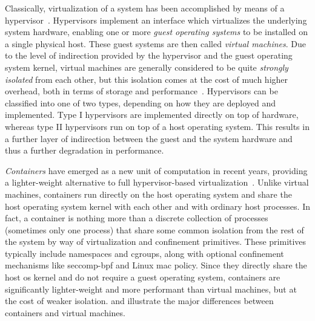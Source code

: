Classically, virtualization of a system has been accomplished by means of
a hypervisor~\cite{eder2016_hypervisor_container, sultan2019_container_security}.
Hypervisors implement an interface which virtualizes the underlying system hardware,
enabling one or more \textit{guest operating systems} to be installed on a single physical
host. These guest systems are then called \textit{virtual machines}. Due to the level of
indirection provided by the hypervisor and the guest operating system kernel, virtual
machines are generally considered to be quite \textit{strongly isolated} from each other,
but this isolation comes at the cost of much higher overhead, both in terms of storage and
performance~\cite{eder2016_hypervisor_container, sultan2019_container_security}.
Hypervisors can be classified into one of two types, depending on how they are deployed
and implemented.  Type I hypervisors are implemented directly on top of hardware, whereas
type II hypervisors run on top of a host operating system. This results in a further layer
of indirection between the guest and the system hardware and thus a further degradation in
performance.

\textit{Containers} have emerged as a new unit of computation in recent years, providing
a lighter-weight alternative to full hypervisor-based
virtualization~\cite{sultan2019_container_security, eder2016_hypervisor_container}.
Unlike virtual machines, containers run directly on the host operating system and share
the host operating system kernel with each other and with ordinary host processes. In
fact, a container is nothing more than a discrete collection of processes (sometimes only
one process) that share some common isolation from the rest of the system by way of
virtualization and confinement primitives. These primitives typically include namespaces
and cgroups, along with optional confinement mechanisms like seccomp-\gls{bpf} and Linux
\gls{mac} policy. Since they directly share the host \gls{os} kernel and do not require
a guest operating system, containers are significantly lighter-weight and more performant
than virtual machines, but at the cost of weaker isolation.  and
 illustrate the major differences between containers and virtual
machines.


